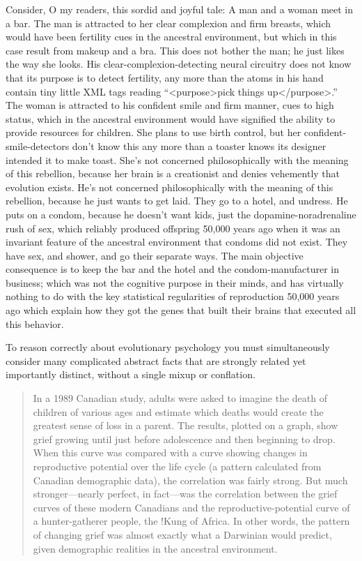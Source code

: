 {{
 Consider, O my readers, this sordid and joyful tale: A man and a
woman meet in a bar. The man is attracted to her clear complexion and
firm breasts, which would have been fertility cues in the ancestral
environment, but which in this case result from makeup and a bra. This
does not bother the man; he just likes the way she looks. His
clear-complexion-detecting neural circuitry does not know that its
purpose is to detect fertility, any more than the atoms in his hand
contain tiny little XML tags reading
``{\textless}purpose{\textgreater}pick things
up{\textless}/purpose{\textgreater}.'' The woman is
attracted to his confident smile and firm manner, cues to high status,
which in the ancestral environment would have signified the ability to
provide resources for children. She plans to use birth control, but her
confident-smile-detectors don't know this any more than
a toaster knows its designer intended it to make toast.
She's not concerned philosophically with the meaning of
this rebellion, because her brain is a creationist and denies
vehemently that evolution exists. He's not concerned
philosophically with the meaning of this rebellion, because he just
wants to get laid. They go to a hotel, and undress. He puts on a
condom, because he doesn't want kids, just the
dopamine-noradrenaline rush of sex, which reliably produced offspring
50,000 years ago when it was an invariant feature of the ancestral
environment that condoms did not exist. They have sex, and shower, and
go their separate ways. The main objective consequence is to keep the
bar and the hotel and the condom-manufacturer in business; which was
not the cognitive purpose in their minds, and has virtually nothing to
do with the key statistical regularities of reproduction 50,000 years
ago which explain how they got the genes that built their brains that
executed all this behavior.}

{
 To reason correctly about evolutionary psychology you must
simultaneously consider many complicated abstract facts that are
strongly related yet importantly distinct, without a single mixup or
conflation.}

\myendsectiontext


\begin{quote}
{
 In a 1989 Canadian study, adults were asked to imagine the death
of children of various ages and estimate which deaths would create the
greatest sense of loss in a parent. The results, plotted on a graph,
show grief growing until just before adolescence and then beginning to
drop. When this curve was compared with a curve showing changes in
reproductive potential over the life cycle (a pattern calculated from
Canadian demographic data), the correlation was fairly strong. But much
stronger---nearly perfect, in fact---was the correlation between the
grief curves of these modern Canadians and the reproductive-potential
curve of a hunter-gatherer people, the !Kung of Africa. In other words,
the pattern of changing grief was almost exactly what a Darwinian would
predict, given demographic realities in the ancestral environment.}


\end{quote}}
